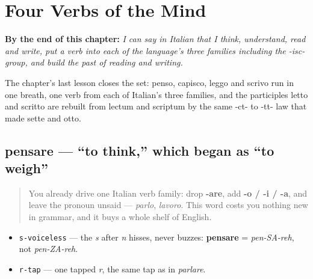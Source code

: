 
\chapter{Four Verbs of the Mind}
\label{ch:it-mind-verbs}

\begin{chapteropening}
\textbf{By the end of this chapter:} \emph{I can say in Italian that I think, understand, read and write, put a verb into each of the language's three families including the -isc- group, and build the past of reading and writing.}

The chapter's last lesson closes the set: penso, capisco, leggo and scrivo run in one breath, one verb from each of Italian's three families, and the participles letto and scritto are rebuilt from lectum and scriptum by the same -ct- to -tt- law that made sette and otto.
\end{chapteropening}

\section[pensare]{pensare — \textquotedblleft{}to think,\textquotedblright{} which began as \textquotedblleft{}to weigh\textquotedblright{}}

\label{lesson:IT-C18-pensare}



\begin{quote}
You already drive one Italian verb family: drop \textbf{-are}, add \textbf{-o / -i / -a}, and leave the pronoun unsaid — \emph{parlo}, \emph{lavoro}. This word costs you nothing new in grammar, and it buys a whole shelf of English.
\end{quote}

\begin{sounds}
\begin{itemize}
\raggedright
  \item \texttt{s-voiceless} — the \emph{s} after \emph{n} hisses, never buzzes: \textbf{pensare} = \emph{pen-SA-reh}, not \emph{pen-ZA-reh}.
  \item \texttt{r-tap} — one tapped \emph{r}, the same tap as in \emph{parlare}.
\end{itemize}
\end{sounds}

